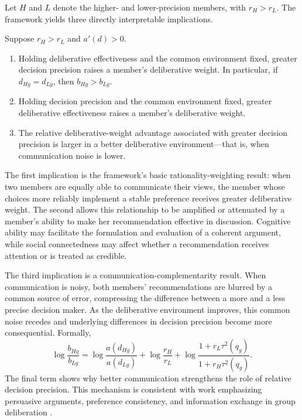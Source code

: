 \documentclass[11 pt]{article}
\begin{document}
Let $H$ and $L$ denote the higher- and lower-precision members, with $r_H>r_L$. The framework yields three directly interpretable implications.

\begin{proposition}
\label{prop:deliberation}
Suppose $r_H>r_L$ and $a'(d)>0$.
\begin{enumerate}
    \item Holding deliberative effectiveness and the common environment fixed, greater decision precision raises a member's deliberative weight. In particular, if $d_{Hg}=d_{Lg}$, then $b_{Hg}>b_{Lg}$.
    \item Holding decision precision and the common environment fixed, greater deliberative effectiveness raises a member's deliberative weight.
    \item The relative deliberative-weight advantage associated with greater decision precision is larger in a better deliberative environment---that is, when communication noise is lower.
\end{enumerate}
\end{proposition}

The first implication is the framework's basic rationality-weighting result: when two members are equally able to communicate their views, the member whose choices more reliably implement a stable preference receives greater deliberative weight. The second allows this relationship to be amplified or attenuated by a member's ability to make her recommendation effective in discussion. Cognitive ability may facilitate the formulation and evaluation of a coherent argument, while social connectedness may affect whether a recommendation receives attention or is treated as credible.

The third implication is a communication-complementarity result. When communication is noisy, both members' recommendations are blurred by a common source of error, compressing the difference between a more and a less precise decision maker. As the deliberative environment improves, this common noise recedes and underlying differences in decision precision become more consequential. Formally,
\begin{equation}
    \log\frac{b_{Hg}}{b_{Lg}}=
    \log\frac{a(d_{Hg})}{a(d_{Lg})}+
    \log\frac{r_H}{r_L}+
    \log\frac{1+r_L\tau^2(q_g)}{1+r_H\tau^2(q_g)}.
    \label{eq:log_weight}
\end{equation}
The final term shows why better communication strengthens the role of relative decision precision. This mechanism is consistent with work emphasizing persuasive arguments, preference consistency, and information exchange in group deliberation \citep{burnstein1975what,goeree2011experimental,mojzisch2014consistency}.
\end{document}
